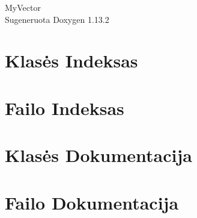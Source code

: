 \documentclass[twoside]{book}
\newcommand{\+}{\discretionary{\mbox{\scriptsize$\hookleftarrow$}}{}{}}
\newcommand{\clearemptydoublepage}{%
    \newpage{\pagestyle{empty}\cleardoublepage}%
  }
\begin{document}
  \raggedbottom
    \hypersetup{pageanchor=false,
                bookmarksnumbered=true,
                pdfencoding=unicode
               }
  \begin{titlepage}
  \vspace*{7cm}
  \begin{center}%
  {\Large My\+Vector}\\
  \vspace*{1cm}
  {\large Sugeneruota Doxygen 1.13.2}\\
  \end{center}
  \end{titlepage}
  \clearemptydoublepage
  \tableofcontents
  \clearemptydoublepage
  \hypersetup{pageanchor=true}
\chapter{Klasės Indeksas}

\chapter{Failo Indeksas}

\chapter{Klasės Dokumentacija}

\chapter{Failo Dokumentacija}



  \backmatter
  \newpage
  \clearemptydoublepage
  \printindex
\end{document}
